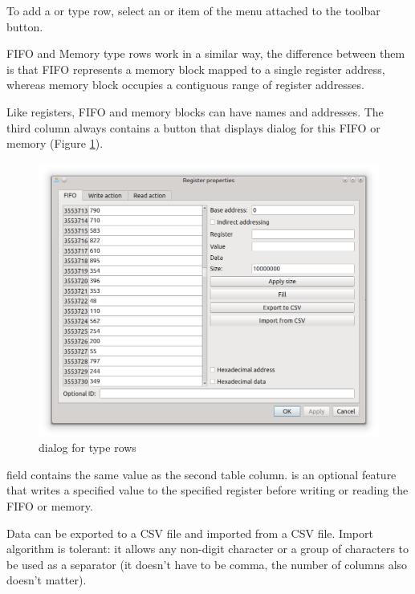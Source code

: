 \documentclass[a4paper,12pt,twoside,extrafontsizes]{memoir}
\begin{document}
To add a  or  type row, select an  or  item of the menu attached to the  toolbar button.

FIFO and Memory type rows work in a similar way, the difference between them is that FIFO represents a memory block mapped to a single register address, whereas memory block occupies a contiguous range of register addresses.

Like registers, FIFO and memory blocks can have names and addresses. The third column always contains a button that displays  dialog for this FIFO or memory (Figure \ref{fig:registermapfifo}).

\begin{figure}[htbp]
\centering
\includegraphics[scale=0.7]{images/registermapfifo.png}
\caption{ dialog for  type rows}
\label{fig:registermapfifo}
\end{figure}

 field contains the same value as the second table column.  is an optional feature that writes a specified value to the specified register before writing or reading the FIFO or memory.

Data can be exported to a CSV file and imported from a CSV file. Import algorithm is tolerant: it allows any non-digit character or a group of characters to be used as a separator (it doesn't have to be comma, the number of columns also doesn't matter).
\end{document}

